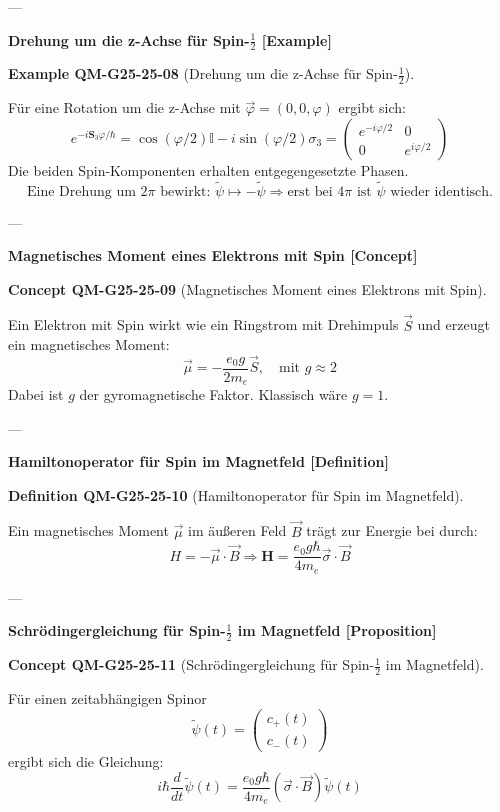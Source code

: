 \documentclass[10pt, letterpaper]{article}
\newcommand{\CustomHeading}[3]{%
  \par\medskip\noindent%
  \textbf{#1 #2} \textnormal{(#3)}.\enskip%
}
\newenvironment{DEF}[2]{\begin{unitbox}\CustomHeading{Definition}{#1}{#2}}{\end{unitbox}}
\newenvironment{EXA}[2]{\begin{unitbox}\CustomHeading{Example}{#1}{#2}}{\end{unitbox}}
\newenvironment{CONC}[2]{\begin{unitbox}\CustomHeading{Concept}{#1}{#2}}{\end{unitbox}}
\begin{document}
---

\textbf{Drehung um die z-Achse für Spin-\(\frac{1}{2}\) [Example]}

\begin{EXA}{QM-G25-25-08}{Drehung um die z-Achse für Spin-\(\frac{1}{2}\)}
Für eine Rotation um die z-Achse mit \( \vec{\varphi} = (0,0,\varphi) \) ergibt sich:
\[
e^{-i \mathbf{S}_3 \varphi / \hbar}
= \cos (\varphi / 2)\mathbb{I}
- i \sin (\varphi / 2)\sigma_3
= \begin{pmatrix}
e^{-i\varphi/2} & 0 \\
0 & e^{i\varphi/2}
\end{pmatrix}
\]
Die beiden Spin-Komponenten erhalten entgegengesetzte Phasen.
\[
\text{Eine Drehung um } 2\pi \text{ bewirkt: } \tilde{\psi} \mapsto -\tilde{\psi}
\Rightarrow \text{erst bei } 4\pi \text{ ist } \tilde{\psi} \text{ wieder identisch.}
\]
\end{EXA}

---

\textbf{Magnetisches Moment eines Elektrons mit Spin [Concept]}

\begin{CONC}{QM-G25-25-09}{Magnetisches Moment eines Elektrons mit Spin}
Ein Elektron mit Spin wirkt wie ein Ringstrom mit Drehimpuls \( \vec{S} \) und erzeugt ein magnetisches Moment:
\[
\vec{\mu} = -\frac{e_0 g}{2 m_e} \vec{S}, \quad \text{mit } g \approx 2
\]
Dabei ist \( g \) der gyromagnetische Faktor. Klassisch wäre \( g = 1 \).
\end{CONC}

---

\textbf{Hamiltonoperator für Spin im Magnetfeld [Definition]}

\begin{DEF}{QM-G25-25-10}{Hamiltonoperator für Spin im Magnetfeld}
Ein magnetisches Moment \( \vec{\mu} \) im äußeren Feld \( \vec{B} \) trägt zur Energie bei durch:
\[
H = -\vec{\mu} \cdot \vec{B}
\Rightarrow
\mathbf{H} = \frac{e_0 g \hbar}{4 m_e} \vec{\sigma} \cdot \vec{B}
\]
\end{DEF}

---

\textbf{Schrödingergleichung für Spin-\(\frac{1}{2}\) im Magnetfeld [Proposition]}

\begin{CONC}{QM-G25-25-11}{Schrödingergleichung für Spin-\(\frac{1}{2}\) im Magnetfeld}
Für einen zeitabhängigen Spinor
\[
\tilde{\psi}(t) = \begin{pmatrix}c_+(t) \\ c_-(t)\end{pmatrix}
\]
ergibt sich die Gleichung:
\[
i\hbar \frac{d}{dt} \tilde{\psi}(t) = \frac{e_0 g \hbar}{4 m_e} (\vec{\sigma} \cdot \vec{B}) \tilde{\psi}(t)
\]
\end{CONC}
\end{document}
